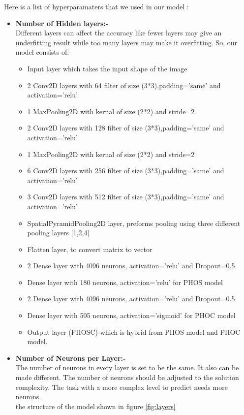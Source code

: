 \noindent
Here is a list of hyperparamaters that we used in our model :
\begin{itemize}[itemsep=1pt, topsep=5pt]
    \item \textbf{Number of Hidden layers:-}\\
    Different layers can affect the accuracy like fewer layers may give an underfitting result while too many layers may make it overfitting. So, our model consists of:
    \begin{itemize}[itemsep=1pt, topsep=5pt]
    \item Input layer which takes the input shape of the image 
    \item 2 Conv2D layers with 64 filter of size (3*3),padding='same' and  activation='relu' 
    \item 1 MaxPooling2D with kernal of size (2*2) and stride=2 
    \item 2 Conv2D layers with 128 filter of size (3*3),padding='same' and  activation='relu' 
    \item 1 MaxPooling2D with kernal of size (2*2) and stride=2
    \item 6 Conv2D layers with 256 filter of size (3*3),padding='same' and  activation='relu' 
    \item 3 Conv2D layers with 512 filter of size (3*3),padding='same' and  activation='relu'
    \item SpatialPyramidPooling2D layer, preforms pooling using three different pooling layers [1,2,4]  
    \item Flatten layer, to convert matrix to vector 
    \item 2 Dense layer with 4096 neurons, activation='relu' and Dropout=0.5
    \item Dense layer with 180 neurons, activation='relu' for PHOS model
    \item 2 Dense layer with 4096 neurons, activation='relu' and Dropout=0.5  
    \item Dense layer with 505 neurons, activation='sigmoid' for PHOC model
    \item Output layer (PHOSC) which is hybrid  from PHOS model and PHOC model.
\end{itemize} 
    \item \textbf{Number of Neurons per Layer:-}\\
    The number of neurons in every layer is set to be the same. It also can be made different. The number of neurons should be adjusted to the solution complexity. The task with a more complex level to predict needs more neurons.\\
    the structure of the model shown in figure \ref{fig:layers}


\end{itemize}

